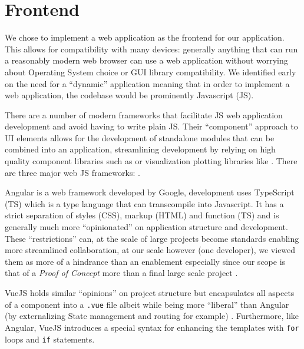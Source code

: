 \documentclass[\version]{l4proj}
\begin{document}
\section{Frontend}

We chose to implement a web application as the frontend for our application.
This allows for compatibility with many devices: generally anything that can run a reasonably modern web browser can use a web application without worrying about Operating System choice or GUI library compatibility.
We identified early on the need for a ``dynamic'' application meaning that in order to implement a web application, the codebase would be prominently Javascript (JS).

There are a number of modern frameworks that facilitate JS web application development and avoid having to write plain JS.
Their ``component'' approach to UI elements allows for the development of standalone modules that can be combined into an application, streamlining development by relying on high quality component libraries such as \textcite{Materialui2020} or visualization plotting libraries like \textcite{Recharts2020}.
There are three major web JS frameworks: \textcite{Angular2020,FacebookReact2020,VuejsVue2020}.

Angular is a web framework developed by Google, development uses TypeScript (TS) which is a type language that can transcompile into Javascript.
It has a strict separation of styles (CSS), markup (HTML) and function (TS) and is generally much more ``opinionated'' on application structure and development.
These ``restrictions'' can, at the scale of large projects become standards enabling more streamlined collaboration, at our scale however (one developer), we viewed them as more of a hindrance than an enablement especially since our scope is that of a \textit{Proof of Concept} more than a final large scale project \autocite{wohlgethanSupportingWebDevelopmentDecisions2018}.

VueJS holds similar ``opinions'' on project structure but encapsulates all aspects of a component into a \lstinline{.vue} file albeit while being more ``liberal'' than Angular (by externalizing State management and routing for example) \autocite{wohlgethanSupportingWebDevelopmentDecisions2018}.
Furthermore, like Angular, VueJS introduces a special syntax for enhancing the templates with \lstinline{for} loops and \lstinline{if} statements.
\end{document}
